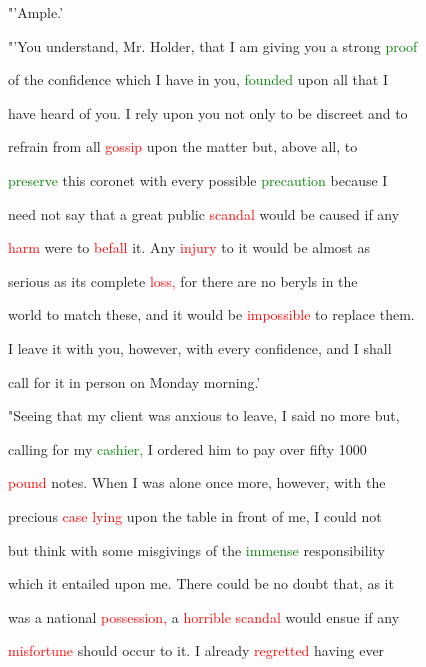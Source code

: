  "'Ample.'



 "'You understand, Mr. Holder, that I am giving you a strong \textcolor{green}{proof}

 of the \textcolor{BurntOrange}{confidence} which I have in you, \textcolor{green}{founded} upon all that I

 have heard of you. I rely upon you not only to be \textcolor{BurntOrange}{discreet} and to

 refrain from all \textcolor{red}{gossip} upon the matter but, above all, to

 \textcolor{green}{preserve} this coronet with every possible \textcolor{green}{precaution} because I

 need not say that a great \textcolor{BurntOrange}{public} \textcolor{red}{scandal} would be caused if any

 \textcolor{red}{harm} were to \textcolor{red}{befall} it. Any \textcolor{red}{injury} to it would be almost as

 serious as its complete \textcolor{red}{loss,} for there are no beryls in the

 world to match these, and it would be \textcolor{red}{impossible} to replace them.

 I \textcolor{BurntOrange}{leave} it with you, however, with every \textcolor{BurntOrange}{confidence,} and I shall

 call for it in person on Monday morning.'



 "Seeing that my client was \textcolor{BurntOrange}{anxious} to \textcolor{BurntOrange}{leave,} I said no more but,

 calling for my \textcolor{green}{cashier,} I ordered him to \textcolor{BurntOrange}{pay} over fifty 1000

 \textcolor{red}{pound} notes. When I was alone once more, however, with the

 \textcolor{BurntOrange}{precious} \textcolor{red}{case} \textcolor{red}{lying} upon the table in front of me, I could not

 but think with some misgivings of the \textcolor{green}{immense} responsibility

 which it entailed upon me. There could be no \textcolor{BurntOrange}{doubt} that, as it

 was a national \textcolor{red}{possession,} a \textcolor{red}{horrible} \textcolor{red}{scandal} would ensue if any

 \textcolor{red}{misfortune} should occur to it. I already \textcolor{red}{regretted} having ever

